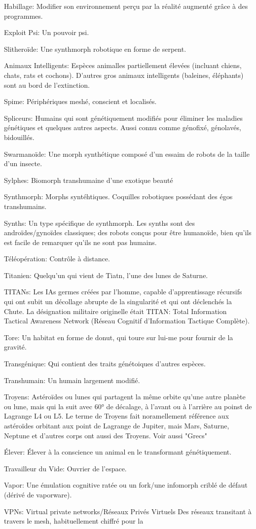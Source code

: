 Habillage: Modifier son environnement perçu par la réalité augmenté grâce à des programmes. \item Exploit Psi: Un pouvoir psi. \item Slitheroïde: Une synthmorph robotique en forme de serpent. \item Animaux Intelligents: Espèces animalles partiellement élevées (incluant chiens, chats, rats et cochons). D'autres gros animaux intelligents (baleines, éléphants) sont au bord de l'extinction. \item Spime: Périphériques meshé, conscient et localisés. \item Spliceurs: Humains qui sont génétiquement modifiés pour éliminer les maladies génétiques et quelques autres aspects. Aussi connu comme génofixé, génolavés, bidouillés. \item Swarmanoïde: Une morph synthétique composé d'un essaim de robots de la taille d'un insecte. \item Sylphes: Biomorph transhumaine d'une exotique beauté  \item Synthmorph: Morphs syntéhtiques. Coquilles robotiques possédant des égos transhumains. \item Synths: Un type spécifique de synthmorph. Les synths sont des androïdes/gynoïdes classiques; des robots conçus pour être humanoïde, bien qu'ils est facile de remarquer qu'ils ne sont pas humains. \item Téléopération: Contrôle à distance. \item Titanien: Quelqu'un qui vient de Tiatn, l'une des lunes de Saturne. \item TITANs: Les IAs germes créées par l'homme, capable d'apprentissage récursifs qui ont subit un décollage abrupte de la singularité et qui ont déclenchés la Chute. La désignation militaire originelle était TITAN: Total Information Tactical Awareness Network (Réseau Cognitif d'Information Tactique Complète). \item Tore: Un habitat en forme de donut, qui toure sur lui-me pour fournir de la gravité. \item Transgénique: Qui contient des traits génétoiques d'autres espèces. \item Transhumain: Un humain largement modifié. \item Troyens: Astéroïdes ou lunes qui partagent la même orbite qu'une autre planète ou lune, mais qui la suit avec 60° de décalage, à l'avant ou à l'arrière au poinst de Lagrange L4 ou L5. Le terme de Troyens fait noramellement référence aux astéroïdes orbitant aux point de Lagrange de Jupiter, mais Mars, Saturne, Neptune et d'autres corps ont aussi des Troyens. Voir aussi "Grecs" \item Élever: Élever à la conscience un animal en le transformant génétiquement. \item Travailleur du Vide: Ouvrier de l'espace. \item Vapor: Une émulation cognitive ratée ou un fork/une infomorph criblé de défaut (dérivé de vaporware). \item VPNs: Virtual private networks/Réseaux Privés Virtuels Des réseaux transitant à travers le mesh, habituellement chiffré pour la 